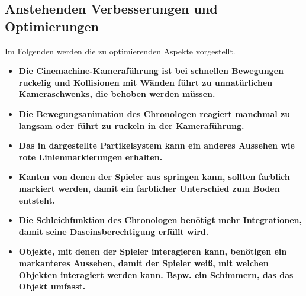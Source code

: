 \subsection{Anstehenden Verbesserungen und Optimierungen}
Im Folgenden werden die zu optimierenden Aspekte vorgestellt.
\begin{itemize}  
    \item \textbf{Die Cinemachine-Kameraführung ist bei schnellen Bewegungen ruckelig und Kollisionen mit Wänden führt zu unnatürlichen Kameraschwenks, die behoben werden müssen.}
    \item \textbf{Die Bewegungsanimation des Chronologen reagiert manchmal zu langsam oder führt zu ruckeln in der Kameraführung.}
     \item \textbf{Das in  dargestellte Partikelsystem kann ein anderes Aussehen wie  rote Linienmarkierungen erhalten.}
     \item \textbf{Kanten von denen der Spieler aus springen kann, sollten farblich markiert werden, damit ein farblicher Unterschied zum Boden entsteht.}
    \item \textbf{Die Schleichfunktion des Chronologen benötigt mehr Integrationen, damit seine Daseinsberechtigung erfüllt wird.}
    \item \textbf{Objekte, mit denen der Spieler interagieren kann, benötigen ein markanteres Aussehen, damit der Spieler weiß, mit welchen Objekten interagiert werden kann. Bspw. ein Schimmern, das das Objekt umfasst.}
\end{itemize}





